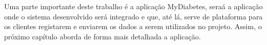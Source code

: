 Uma parte importante deste trabalho é a aplicação MyDiabetes, seraá a aplicação onde o sistema desenvolvido será integrado e que, até lá, serve de plataforma para os clientes registarem e enviarem os dados a serem utilizados no projeto. Assim, o próximo capítulo aborda de forma mais detalhada a aplicação.








